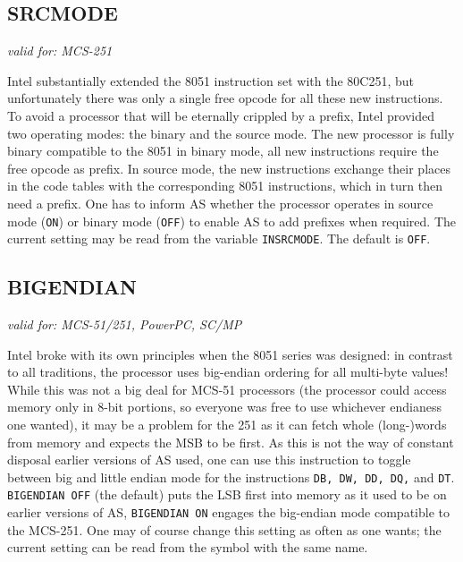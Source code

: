 \documentclass[12pt,twoside]{report}
\makeatletter
\newcommand{\tty}[1]{{\tt #1}}
\newcommand{\ttindex}[1]{\index{#1@{\tt #1}}}
\makeatother
\begin{document}

\subsection{SRCMODE}
\ttindex{SRCMDE}

{\em valid for: MCS-251}

Intel substantially extended the 8051 instruction set with the 80C251, but
unfortunately there was only a single free opcode for all these new
instructions.  To avoid a processor that will be eternally crippled by a
prefix, Intel provided two operating modes: the binary and the source
mode.  The new processor is fully binary compatible to the 8051 in binary
mode, all new instructions require the free opcode as prefix.  In source
mode, the new instructions exchange their places in the code tables with
the corresponding 8051 instructions, which in turn then need a prefix.
One has to inform AS whether the processor operates in source mode
(\tty{ON}) or binary mode (\tty{OFF}) to enable AS to add prefixes when
required.  The current setting may be read from the variable
\tty{INSRCMODE}.  The default is \tty{OFF}.


\subsection{BIGENDIAN}
\ttindex{BIGENDIAN}

{\em valid for: MCS-51/251, PowerPC, SC/MP}

Intel broke with its own principles when the 8051 series was designed: in
contrast to all traditions, the processor uses big-endian ordering for all
multi-byte values!  While this was not a big deal for MCS-51 processors
(the processor could access memory only in 8-bit portions, so everyone was
free to use whichever endianess one wanted), it may be a problem for the
251 as it can fetch whole (long-)words from memory and expects the MSB to
be first.  As this is not the way of constant disposal earlier versions of
AS used, one can use this instruction to toggle between big and
little endian mode for the instructions \tty{DB, DW, DD, DQ,} and
\tty{DT}.  \tty{BIGENDIAN OFF} (the default) puts the LSB first into
memory as it used to be on earlier versions of AS, \tty{BIGENDIAN ON}
engages the big-endian mode compatible to the MCS-251.  One may of course
change this setting as often as one wants; the current setting can be read
from the symbol with the same name.
\end{document}
